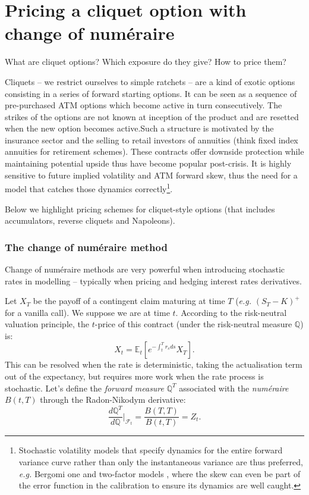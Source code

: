 \section{Pricing a cliquet option with change of num\'eraire}

\begin{tcolorbox}[width=\linewidth, sharp corners=all, colback=white!95!black]
What are cliquet options? Which exposure do they give? How to price them?
\end{tcolorbox}

Cliquets -- we restrict ourselves to simple ratchets -- are a kind of exotic options consisting in a series of forward starting options. It can be seen as a sequence of pre-purchased ATM options which become active in turn consecutively. The strikes of the options are not known at inception of the product and are resetted when the new option becomes active.\newline Such a structure is motivated by the insurance sector and the selling to retail investors of annuities (think fixed index annuities for retirement schemes). These contracts offer downside protection while maintaining potential upside thus have become popular post-crisis. \newline It is highly sensitive to future implied volatility and ATM forward skew, thus the need for a model that catches those dynamics correctly\footnote{Stochastic volatility models that specify dynamics for the entire forward variance curve rather than only the instantaneous variance are thus preferred, \textit{e.g.} Bergomi one and two-factor models \cite{bergomi2004smile, bergomi2005smile}, where the skew can even be part of the error function in the calibration to ensure its dynamics are well caught.}.

Below we highlight pricing schemes for cliquet-style options (that includes accumulators, reverse cliquets and Napoleons).

\subsubsection*{The change of num\'eraire method}

Change of num\'eraire methods are very powerful when introducing stochastic rates in modelling -- typically when pricing and hedging interest rates derivatives.

Let $X_T$ be the payoff of a contingent claim maturing at time $T$ (\textit{e.g.} $(S_T-K)^{+}$ for a vanilla call). We suppose we are at time $t$. 
According to the risk-neutral valuation principle, the $t$-price of this contract (under the risk-neutral measure $\mathbb{Q}$) is: \[X_t = \mathbb{E}_t\left[e^{-\int_t^T r_s ds} X_T\right].\]
This can be resolved when the rate is deterministic, taking the actualisation term out of the expectancy, but requires more work when the rate process is stochastic. \newline Let's define the \textit{forward measure} $\mathbb{Q}^{T}$ associated with the \textit{num\'eraire} $B(t,T)$ through the Radon-Nikodym derivative: \[\dfrac{d\mathbb{Q}^{T}}{d \mathbb{Q}}\bigg|_{\mathcal{F}_t} = \dfrac{B(T,T)}{B(t,T)} = Z_t.\]%

